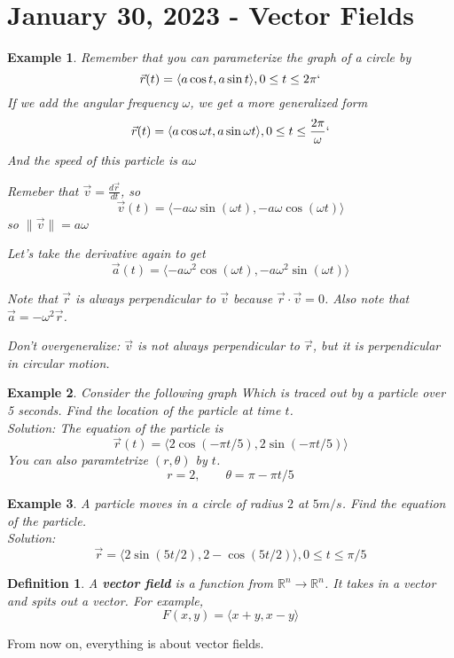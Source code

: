 \documentclass[11pt]{article}
\newtheorem{defn}{Definition}
\newtheorem{ex}{Example}
\begin{document}
\section{January 30, 2023 - Vector Fields}
\begin{ex}
Remember  that you can parameterize the graph of a circle by
\[\vec{r}(t) = \langle a\cos t, a \sin t \rangle , 0 \le t \le 2\pi`\]
If we add the angular frequency $\omega$, we get a more generalized form
\[\vec{r}(t) = \langle a\cos \omega t, a \sin \omega t \rangle , 0 \le t \le \frac{2\pi}{\omega}`\]
And the speed of this particle is $a \omega$

Remeber that $\vec{v} = \frac{d\vec{r}}{dt}$,
so
\[\vec{v}(t) = \langle -a\omega \sin(\omega t), - a \omega \cos (\omega t) \rangle\]
so $\|\vec{v}\| = a \omega$

Let's take the derivative again to get
\[\vec{a}(t)  = \langle -a \omega^{2} \cos(\omega t), -a \omega^{2} \sin(\omega t) \rangle\]

Note that $\vec{r}$ is always perpendicular to $\vec{v}$ because
$\vec{r} \cdot \vec{v} = 0$. Also note that $\vec{a}  = -\omega^{2} \vec{r}$.

Don't overgeneralize: $\vec{v}$ is not always perpendicular to $\vec{r}$, but it is perpendicular in circular motion.
\end{ex}
\begin{ex}
  Consider the following graph
  Which is traced out by a particle over 5 seconds. Find the location of the particle at time $t$.\\
  Solution: The equation of the particle is
  \[\vec{r}(t) = \langle 2 \cos(-\pi t/5), 2 \sin (-\pi t/5) \rangle\]
  You can also paramtetrize $(r, \theta)$ by $t$.
  \[r = 2, \qquad\theta = \pi - \pi t/5\]
\end{ex}

\begin{ex}
  A particle moves in a circle of radius $2$ at $5 m/s$. Find the equation of the particle. \\
  Solution:
  \[\vec{r} = \langle 2 \sin (5 t /2) , 2 -\cos (5t / 2)\rangle,  0 \le t \le \pi / 5 \]

\end{ex}
\begin{defn}
  A \textbf{vector field} is a function from $\mathbb{R}^{n} \to \mathbb{R}^{n}$. It takes in a vector and spits out a vector.  For example,
  \[F(x,y) = \langle x + y, x - y \rangle\]
\end{defn}
From now on, everything is about vector fields.
\end{document}

